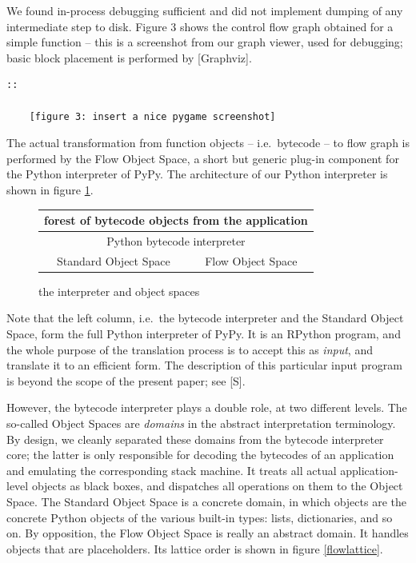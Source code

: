 \documentclass{acm_proc_article-sp}
\begin{document}
We found in-process debugging sufficient and did not implement dumping
of any intermediate step to disk.  Figure 3 shows the control flow graph
obtained for a simple function -- this is a screenshot from our graph
viewer, used for debugging; basic block placement is performed by
[Graphviz].

\begin{verbatim}
::

    [figure 3: insert a nice pygame screenshot]
\end{verbatim}
    
The actual transformation from function objects -- i.e.\ bytecode -- to
flow graph is performed by the Flow Object Space, a short but generic
plug-in component for the Python interpreter of PyPy.  The architecture
of our Python interpreter is shown in figure \ref{interpobjspace}.

\begin{figure}
  \centering
  \caption{the interpreter and object spaces}
  \label{interpobjspace}
  \begin{tabular}{|c|c|} \hline
\multicolumn{2}{|c|}{forest of bytecode objects from the application}    \\ \hline
\multicolumn{2}{|c|}{Python bytecode interpreter}            \\ \hline
    Standard Object Space     &  Flow Object Space  \\ \hline
  \end{tabular}
\end{figure}

Note that the left column, i.e.\ the bytecode interpreter and the
Standard Object Space, form the full Python interpreter of PyPy.  It is
an RPython program, and the whole purpose of the translation process is
to accept this as \textit{input}, and translate it to an efficient form.
The description of this particular input program is beyond the scope of
the present paper; see [S].

However, the bytecode interpreter plays a double role, at two different
levels.  The so-called Object Spaces are \textit{domains} in the abstract
interpretation terminology.  By design, we cleanly separated these
domains from the bytecode interpreter core; the latter is only
responsible for decoding the bytecodes of an application and emulating
the corresponding stack machine.  It treats all actual application-level
objects as black boxes, and dispatches all operations on them to the
Object Space.  The Standard Object Space is a concrete domain, in which
objects are the concrete Python objects of the various built-in types:
lists, dictionaries, and so on.  By opposition, the Flow Object Space is
really an abstract domain.  It handles objects that are placeholders.
Its lattice order is shown in figure \ref{flowlattice}.
\end{document}
